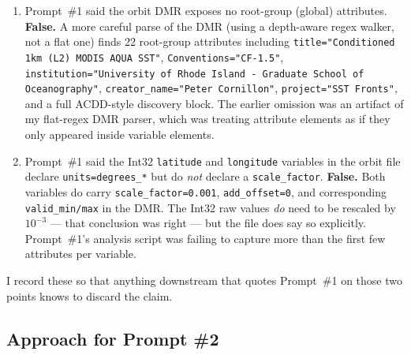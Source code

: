\documentclass[11pt]{article}
\begin{document}
\begin{enumerate}
  \item Prompt~\#1 said the orbit DMR exposes no root-group
    (global) attributes. \textbf{False.} A more careful parse of
    the DMR (using a depth-aware regex walker, not a flat one)
    finds 22 root-group attributes including
    \texttt{title="Conditioned 1km (L2) MODIS AQUA SST"},
    \texttt{Conventions="CF-1.5"}, \texttt{institution="University
    of Rhode Island - Graduate School of Oceanography"},
    \texttt{creator\_name="Peter Cornillon"},
    \texttt{project="SST Fronts"}, and a full ACDD-style discovery
    block. The earlier omission was an artifact of my flat-regex
    DMR parser, which was treating attribute elements as if they
    only appeared inside variable elements.
  \item Prompt~\#1 said the Int32 \texttt{latitude} and
    \texttt{longitude} variables in the orbit file declare
    \texttt{units=degrees\_*} but do \emph{not} declare a
    \texttt{scale\_factor}. \textbf{False.} Both variables do
    carry \texttt{scale\_factor=0.001}, \texttt{add\_offset=0},
    and corresponding \texttt{valid\_min/max} in the DMR. The
    Int32 raw values \emph{do} need to be rescaled by $10^{-3}$
    --- that conclusion was right --- but the file does say so
    explicitly. Prompt~\#1's analysis script was failing to
    capture more than the first few attributes per variable.
\end{enumerate}

I record these so that anything downstream that quotes Prompt~\#1
on those two points knows to discard the claim.

\subsection{Approach for Prompt \#2}
\end{document}
